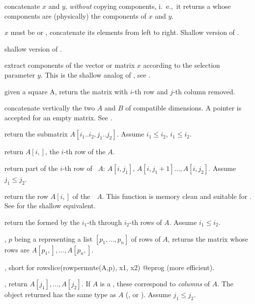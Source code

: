  concatenate $x$ and $y$, \emph{without}
copying components, i.~e.,~it returns a  whose components are
(physically) the components of $x$ and $y$.

$x$ must be  or , concatenate
its elements from left to right. Shallow version of .

 shallow version of .

 extract components
of the vector or matrix $x$ according to the selection parameter $y$.
This is the shallow analog of , see .

 given a square  A,
return the matrix with $i$-th row and $j$-th column removed.

 concatenate vertically the two  $A$
and $B$ of compatible dimensions. A  pointer is accepted for an
empty matrix. See .

return the submatrix $A[i_1..i_2,j_1..j_2]$.
Assume $i_1 \leq i_2$,  $i_1 \leq i_2$.

 return $A[i,]$, the $i$-th row of the 
$A$.

 return part of the $i$-th
row of ~$A$: $A[i,j_1]$, $A[i,j_1+1]\dots,A[i,j_2]$. Assume $j_1
\leq j_2$.

 return the row $A[i,]$ of
the~~$A$. This function is memory clean and suitable for
. See  for the shallow equivalent.

 return the 
formed by the $i_1$-th through $i_2$-th rows of  $A$. Assume $i_1
\leq i_2$.

, $p$ being a 
representing a list $[p_1,\dots,p_n]$ of rows of  $A$, returns the
matrix whose rows are $A[p_1,],\dots, A[p_n,]$.

, short for
\bprog
  rowslice(rowpermute(A,p), x1, x2)
@eprog\noindent
(more efficient).

, return $A[j_1], \dots,
A[j_2]$. If $A$ is a , these correspond to \emph{columns} of $A$.
The object returned has the same type as $A$ (,  or
). Assume $j_1 \leq j_2$.

